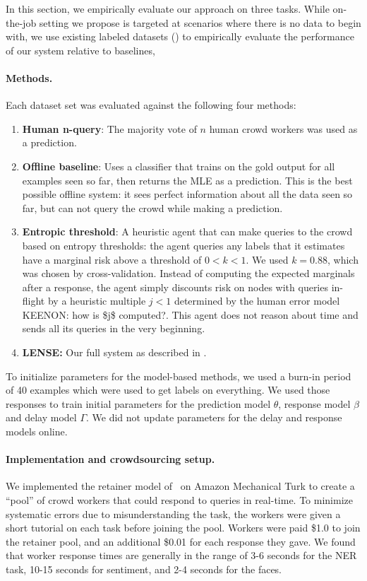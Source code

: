 
In this section, we empirically evaluate our approach on three tasks. 
While on-the-job setting we propose is targeted at scenarios where there is no data to begin with, we use existing labeled datasets () to empirically evaluate the performance of our system relative to baselines,

\paragraph{Methods.}
Each dataset set was evaluated against the following four methods:
\begin{enumerate}
  \item {\bf Human n-query}: The majority vote of $n$ human crowd workers was used as a prediction.
  \item {\bf Offline baseline}:
    Uses a classifier that trains on the gold output for all examples seen so far, then returns the MLE as a prediction.
    This is the best possible offline system: it sees perfect information about all the data seen so far, but can not query the crowd while making a prediction.
  \item {\bf Entropic threshold}: A heuristic agent that can make queries to the crowd based on entropy thresholds: the agent queries any labels that it estimates have a marginal risk above a threshold of $0 < k < 1$. We used $k = 0.88$, which was chosen by cross-validation.
    Instead of computing the expected marginals after a response, the agent simply discounts risk on nodes with queries in-flight by a heuristic multiple $j < 1$ determined by the human error model \ac{KEENON: how is $j$ computed?}.
    This agent does not reason about time and sends all its queries in the very beginning.
  \item {\bf LENSE:} Our full system as described in .
\end{enumerate}

To initialize parameters for the model-based methods, we used a burn-in period of 40 examples which were used to get labels on everything. We used those responses to train initial parameters for the prediction model $\theta$, response model $\beta$ and delay model $\Gamma$.
We did not update parameters for the delay and response models online.

\paragraph{Implementation and crowdsourcing setup.}
We implemented the retainer model of~\cite{bernstein2011crowds} on Amazon Mechanical Turk to create a ``pool'' of crowd workers that could respond to queries in real-time.
To minimize systematic errors due to misunderstanding the task,
the workers were given a short tutorial on each task before joining the pool. 
Workers were paid \$1.0 to join the retainer pool, and an additional \$0.01 for each response they gave.
We found that worker response times are generally in the range of 3-6 seconds for the NER task, 10-15 seconds for sentiment, and 2-4 seconds for the faces.

